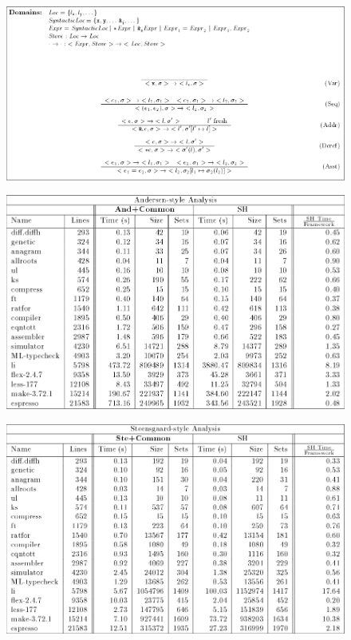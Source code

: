 \documentclass{beamer}
\begin{document}
\begin{frame}
  \begin{figure}
    \centering
    \includegraphics[scale=0.3]{operational_semantics.png}
  \end{figure}
\end{frame}

\begin{frame}
  \begin{figure}
    \centering
    \includegraphics[scale=0.3]{andersen_comparison.png}
  \end{figure}
\end{frame}

\begin{frame}
  \begin{figure}
    \centering
    \includegraphics[scale=0.3]{steensgard_comparison.png}
  \end{figure}
\end{frame}
\end{document}
